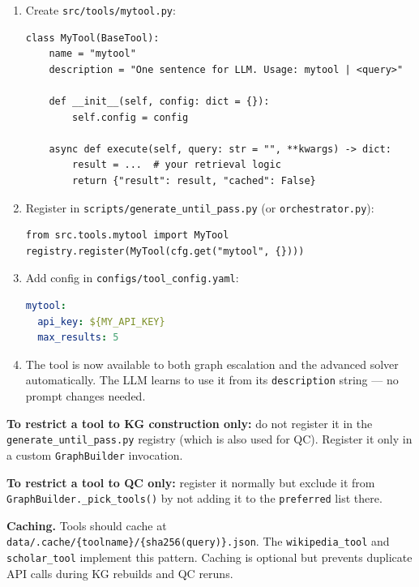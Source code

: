 \documentclass[11pt,a4paper]{article}
\begin{document}
\begin{enumerate}[leftmargin=*,noitemsep]
  \item Create \texttt{src/tools/mytool.py}:
\begin{lstlisting}[style=py]
class MyTool(BaseTool):
    name = "mytool"
    description = "One sentence for LLM. Usage: mytool | <query>"

    def __init__(self, config: dict = {}):
        self.config = config

    async def execute(self, query: str = "", **kwargs) -> dict:
        result = ...  # your retrieval logic
        return {"result": result, "cached": False}
\end{lstlisting}

  \item Register in \texttt{scripts/generate\_until\_pass.py} (or \texttt{orchestrator.py}):
\begin{lstlisting}[style=py]
from src.tools.mytool import MyTool
registry.register(MyTool(cfg.get("mytool", {})))
\end{lstlisting}

  \item Add config in \texttt{configs/tool\_config.yaml}:
\begin{lstlisting}[style=py, language=yaml]
mytool:
  api_key: ${MY_API_KEY}
  max_results: 5
\end{lstlisting}

  \item The tool is now available to both graph escalation and the advanced solver automatically. The LLM learns to use it from its \texttt{description} string — no prompt changes needed.
\end{enumerate}

\textbf{To restrict a tool to KG construction only:} do not register it in the \texttt{generate\_until\_pass.py} registry (which is also used for QC). Register it only in a custom \texttt{GraphBuilder} invocation.

\textbf{To restrict a tool to QC only:} register it normally but exclude it from \texttt{GraphBuilder.\_pick\_tools()} by not adding it to the \texttt{preferred} list there.

\textbf{Caching.} Tools should cache at \texttt{data/.cache/\{toolname\}/\{sha256(query)\}.json}. The \texttt{wikipedia\_tool} and \texttt{scholar\_tool} implement this pattern. Caching is optional but prevents duplicate API calls during KG rebuilds and QC reruns.

\end{document}

